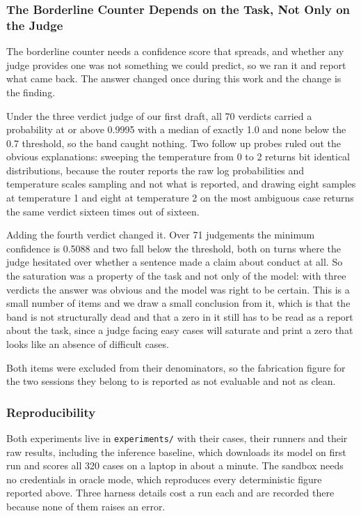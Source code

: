 \documentclass[11pt,a4paper]{article}
\begin{document}
\subsubsection{The Borderline Counter Depends on the Task, Not Only on the Judge}

The borderline counter needs a confidence score that spreads, and whether any judge
provides one was not something we could predict, so we ran it and report what came
back. The answer changed once during this work and the change is the finding.

Under the three verdict judge of our first draft, all 70 verdicts carried a probability
at or above 0.9995 with a median of exactly 1.0 and none below the 0.7 threshold, so
the band caught nothing. Two follow up probes ruled out the obvious explanations:
sweeping the temperature from 0 to 2 returns bit identical distributions, because the
router reports the raw log probabilities and temperature scales sampling and not what
is reported, and drawing eight samples at temperature 1 and eight at temperature 2 on
the most ambiguous case returns the same verdict sixteen times out of sixteen.

Adding the fourth verdict changed it. Over 71 judgements the minimum confidence is
0.5088 and two fall below the threshold, both on turns where the judge hesitated over
whether a sentence made a claim about conduct at all. So the saturation was a property
of the task and not only of the model: with three verdicts the answer was obvious and
the model was right to be certain. This is a small number of items and we draw a small
conclusion from it, which is that the band is not structurally dead and that a zero in
it still has to be read as a report about the task, since a judge facing easy cases
will saturate and print a zero that looks like an absence of difficult cases.

Both items were excluded from their denominators, so the fabrication figure for the two
sessions they belong to is reported as not evaluable and not as clean.

\subsubsection{Reproducibility}

Both experiments live in \texttt{experiments/} with their cases, their runners and
their raw results, including the inference baseline, which downloads its model on first
run and scores all 320 cases on a laptop in about a minute. The sandbox needs no credentials in oracle mode, which reproduces
every deterministic figure reported above. Three harness details cost a run each and
are recorded there because none of them raises an error.
\end{document}
